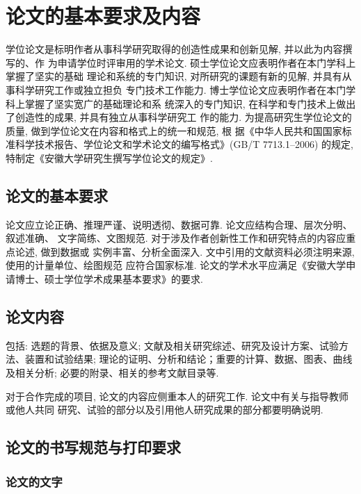 
\chapter{论文的基本要求及内容}

学位论文是标明作者从事科学研究取得的创造性成果和创新见解, 并以此为内容撰写的、作
为申请学位时评审用的学术论文. 硕士学位论文应表明作者在本门学科上掌握了坚实的基础
理论和系统的专门知识, 对所研究的课题有新的见解, 并具有从事科学研究工作或独立担负
专门技术工作能力. 博士学位论文应表明作者在本门学科上掌握了坚实宽广的基础理论和系
统深入的专门知识, 在科学和专门技术上做出了创造性的成果, 并具有独立从事科学研究工
作的能力. 为提高研究生学位论文的质量, 做到学位论文在内容和格式上的统一和规范, 根
据《中华人民共和国国家标准科学技术报告、学位论文和学术论文的编写格式》(GB/T 7713.1--2006)
的规定, 特制定《安徽大学研究生撰写学位论文的规定》.


\section{论文的基本要求}

论文应立论正确、推理严谨、说明透彻、数据可靠. 论文应结构合理、层次分明、叙述准确、
文字简练、文图规范. 对于涉及作者创新性工作和研究特点的内容应重点论述, 做到数据或
实例丰富、分析全面深入. 文中引用的文献资料必须注明来源, 使用的计量单位、绘图规范
应符合国家标准. 论文的学术水平应满足《安徽大学申请博士、硕士学位学术成果基本要求》的要求.


\section{论文内容}

包括: 选题的背景、依据及意义; 文献及相关研究综述、研究及设计方案、试验方法、装置和试验结果;
理论的证明、分析和结论；重要的计算、数据、图表、曲线及相关分析; 必要的附录、相关的参考文献目录等.

对于合作完成的项目, 论文的内容应侧重本人的研究工作. 论文中有关与指导教师或他人共同
研究、试验的部分以及引用他人研究成果的部分都要明确说明.


\section{论文的书写规范与打印要求}

\subsection{论文的文字}

